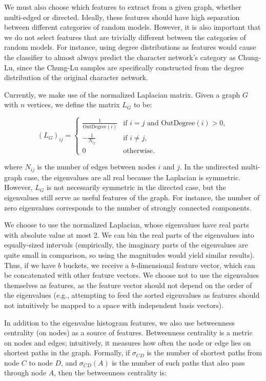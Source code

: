 \documentclass{article} %
\begin{document}
We must also choose which features to extract from a given graph, whether multi-edged or directed. Ideally, these features should have high separation between different categories of random models. However, it is also important that we do not select features that are trivially different between the categories of random models. For instance, using degree distributions as features would cause the classifier to almost always predict the character network’s category as Chung-Lu, since the Chung-Lu samples are specifically constructed from the degree distribution of the original character network.

Currently, we make use of the normalized Laplacian matrix. Given a graph \( G \) with \( n \) vertices, we define the matrix \( L_G \) to be:

\[
(L_G)_{ij} =
\begin{cases}
\frac{1}{\text{OutDegree}(i)} & \text{if } i = j \text{ and OutDegree}(i) > 0, \\
-\frac{1}{N_{ij}} & \text{if } i \neq j, \\
0 & \text{otherwise}.
\end{cases}
\]

where \( N_{ij} \) is the number of edges between nodes \( i \) and \( j \). In the undirected multi-graph case, the eigenvalues are all real because the Laplacian is symmetric. However, \( L_G \) is not necessarily symmetric in the directed case, but the eigenvalues still serve as useful features of the graph. For instance, the number of zero eigenvalues corresponds to the number of strongly connected components.

We choose to use the normalized Laplacian, whose eigenvalues have real parts with absolute value at most 2. We can bin the real parts of the eigenvalues into equally-sized intervals (empirically, the imaginary parts of the eigenvalues are quite small in comparison, so using the magnitudes would yield similar results). Thus, if we have \( b \) buckets, we receive a \( b \)-dimensional feature vector, which can be concatenated with other feature vectors. We choose not to use the eigenvalues themselves as features, as the feature vector should not depend on the order of the eigenvalues (e.g., attempting to feed the sorted eigenvalues as features should not intuitively be mapped to a space with independent basis vectors).

In addition to the eigenvalue histogram features, we also use betweenness centrality (on nodes) as a source of features. Betweenness centrality is a metric on nodes and edges; intuitively, it measures how often the node or edge lies on shortest paths in the graph. Formally, if \( \sigma_{CD} \) is the number of shortest paths from node \( C \) to node \( D \), and \( \sigma_{CD}(A) \) is the number of such paths that also pass through node \( A \), then the betweenness centrality is:
\end{document}
